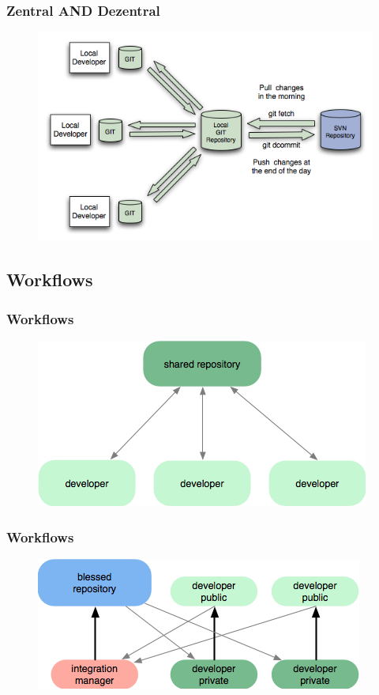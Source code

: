 \documentclass{beamer}
\begin{document}
\begin{frame}\frametitle{Zentral AND Dezentral}
\begin{figure}
\includegraphics[scale=.5]{Bilder/using-git-with-svn-repo}
\end{figure}
\end{frame}

\subsection{Workflows}
\begin{frame}\frametitle{Workflows}
\begin{figure}
\includegraphics[scale=.9]{Bilder/workflow-a}
\end{figure}
\end{frame}

\begin{frame}\frametitle{Workflows}
\begin{figure}
\includegraphics[scale=.9]{Bilder/workflow-b}
\end{figure}
\end{frame}
\end{document}
